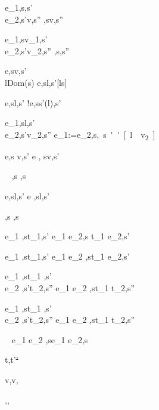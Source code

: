   {e_1,s\evaluate \False,s'\\
   e_2,s'\evaluate v,s''}
  {,s\evaluate v,s''}

  {e_1,s\evaluate v_1,s'\\
   e_2,s'\evaluate v_2,s''}
  {,s\evaluate{},s''}

  {e,s\evaluate v,s'\\
   l\not\in Dom(s)}
  {\Ref e,s\evaluate l,s'[l\mapsto s]}

  {e,s\evaluate l,s'}
  {!e,s\evaluate s'(l),s'}

  {e_1,s\evaluate l,s'\\
   e_2,s'\evaluate v_2,s''}
  {e_1:=e_2,s\evaluate \unit,s''[l\mapsto v_2]}

  {e,s \evaluate v,s'}
  {\Edit e , s\evaluate \Edit v,s'}

  {\ }
  {\Enter \beta,s \evaluate \Enter \beta,s}

  {e,s\evaluate l,s'}
  {\Update e ,s\evaluate \Update l,s'}


  { }
  {\Fail,s \evaluate \Fail,s}


  {e_1 ,s\evaluate t_1,s'}
  {e_1 \Then e_2,s \evaluate t_1 \Then e_2,s'}

  {e_1 ,s\evaluate t_1,s'}
  {e_1 \Next e_2 ,s\evaluate t_1 \Next e_2,s'}


  {e_1 ,s\evaluate t_1 ,s'\\
   e_2 ,s'\evaluate t_2,s''}
  {e_1 \And e_2 ,s\evaluate t_1 \And t_2,s''}


  {e_1 ,s\evaluate t_1 ,s'\\
   e_2 ,s'\evaluate t_2,s''}
  {e_1 \Or e_2 ,s\evaluate t_1 \Or t_2,s''}

  {\ }
  {e_1 \Xor e_2 ,s\evaluate e_1 \Xor e_2,s}







  {t,\Sigma \normalise t'\st{'}}


  { }
  {\Edit v,\Sigma \normalise \Edit v,\Sigma}

  { }
  {\Enter \beta,\Sigma \normalise \Enter \beta,\Sigma}

